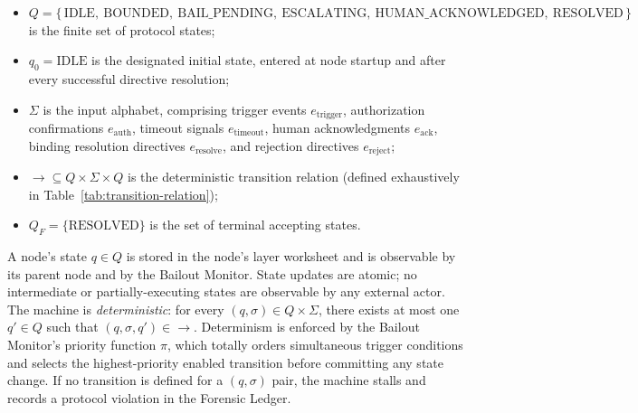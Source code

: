 \begin{itemize}\itemsep0em
\item $Q = \{\,\text{IDLE},\ \text{BOUNDED},\ \text{BAIL\_PENDING},\ \text{ESCALATING},\ \text{HUMAN\_ACKNOWLEDGED},\ \text{RESOLVED}\,\}$ is the finite set of protocol states;
\item $q_0 = \text{IDLE}$ is the designated initial state, entered at node startup and after every successful directive resolution;
\item $\Sigma$ is the input alphabet, comprising trigger events $e_{\text{trigger}}$, authorization confirmations $e_{\text{auth}}$, timeout signals $e_{\text{timeout}}$, human acknowledgments $e_{\text{ack}}$, binding resolution directives $e_{\text{resolve}}$, and rejection directives $e_{\text{reject}}$;
\item $\rightarrow \subseteq Q \times \Sigma \times Q$ is the deterministic transition relation (defined exhaustively in Table~\ref{tab:transition-relation});
\item $Q_F = \{\text{RESOLVED}\}$ is the set of terminal accepting states.
\end{itemize}

A node's state $q \in Q$ is stored in the node's \fact{} layer worksheet and is observable by its parent node and by the Bailout Monitor. State updates are atomic; no intermediate or partially-executing states are observable by any external actor. The machine is \emph{deterministic}: for every $(q, \sigma) \in Q \times \Sigma$, there exists at most one $q' \in Q$ such that $(q, \sigma, q') \in \rightarrow$. Determinism is enforced by the Bailout Monitor's priority function $\pi$, which totally orders simultaneous trigger conditions and selects the highest-priority enabled transition before committing any state change. If no transition is defined for a $(q, \sigma)$ pair, the machine stalls and records a protocol violation in the Forensic Ledger.

